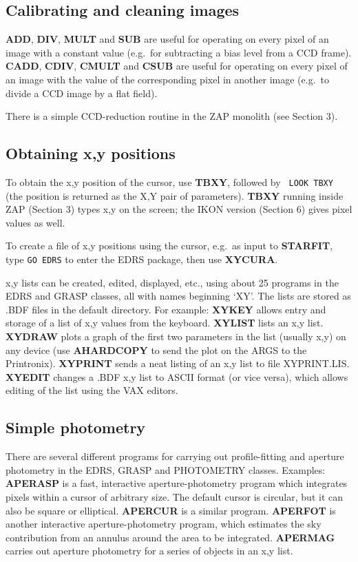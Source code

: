 \subsection {Calibrating and cleaning images}

{\bf ADD}, {\bf DIV}, {\bf MULT} and {\bf SUB} are useful for operating on
every pixel of an image with a constant value (e.g.\ for subtracting a bias
level from a CCD frame).
{\bf CADD}, {\bf CDIV}, {\bf CMULT} and {\bf CSUB} are useful for operating
on every pixel of an image with the value of the corresponding pixel in
another image (e.g.\ to divide a CCD image by a flat field).

There is a simple CCD-reduction routine in the ZAP monolith (see Section 3).

\subsection {Obtaining x,y positions}

To obtain the x,y position of the cursor, use {\bf TBXY}, followed by {\tt
LOOK TBXY} (the position is returned as the X,Y pair of parameters).
{\bf TBXY} running inside ZAP (Section 3) types x,y on the screen; the IKON version (Section 6) gives
pixel values as well.

To create a file of x,y positions using the cursor, e.g.\ as input to
{\bf STARFIT}, type {\tt GO EDRS} to enter the EDRS package, then use
{\bf XYCURA}.

x,y lists can be created, edited, displayed, etc., using about 25 programs
in the EDRS and GRASP classes, all with names beginning `XY'.
The lists are stored as .BDF files in the default directory.
For example:
{\bf XYKEY} allows entry and storage of a list of x,y values from the
keyboard.
{\bf XYLIST} lists an x,y list.
{\bf XYDRAW} plots a graph of the first two parameters in the list (usually
x,y) on any device (use {\bf AHARDCOPY} to send the plot on the ARGS to the
Printronix).
{\bf XYPRINT} sends a neat listing of an x,y list to file XYPRINT.LIS.
{\bf XYEDIT} changes a .BDF x,y list to ASCII format (or vice versa), which
allows editing of the list using the VAX editors.

\subsection {Simple photometry}

There are several different programs for carrying out profile-fitting and
aperture photometry in the EDRS, GRASP and PHOTOMETRY classes.
Examples:
{\bf APERASP} is a fast, interactive aperture-photometry program which
integrates pixels within a cursor of arbitrary size.
The default cursor is circular, but it can also be square or elliptical.
{\bf APERCUR} is a similar program.
{\bf APERFOT} is another interactive aperture-photometry program,
which estimates the sky contribution from an annulus around the 
area to be integrated.
{\bf APERMAG} carries out aperture photometry for a series of objects
in an x,y list.


